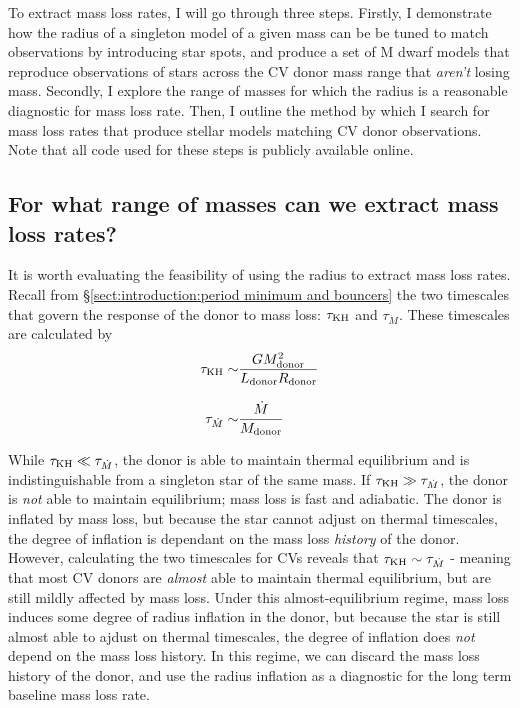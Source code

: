 To extract mass loss rates, I will go through three steps.
Firstly, I demonstrate how the radius of a singleton model of a given mass can be be tuned to match observations by introducing star spots, and produce a set of M dwarf models that reproduce observations of stars across the CV donor mass range that \textit{aren't} losing mass.
Secondly, I explore the range of masses for which the radius is a reasonable diagnostic for mass loss rate.
Then, I outline the method by which I search for mass loss rates that produce stellar models matching CV donor observations.
Note that all code used for these steps is publicly available online.


\subsection{For what range of masses can we extract mass loss rates?}
\label{sect:modelling:MESA massloss allowable mass range}

It is worth evaluating the feasibility of using the radius to extract mass loss rates. Recall from \S\ref{sect:introduction:period minimum and bouncers} the two timescales that govern the response of the donor to mass loss: $\tau_{\rm KH}$ and $\tau_{\dot M}$. These timescales are calculated by
\begin{align}
    \tau_{\rm KH} \sim& \frac{G M_{\rm donor}^2}{L_{\rm donor} R_{\rm donor}} \\[8pt]
    \tau_{\dot M} \sim& \frac{\dot M}{M_{\rm donor}}
\end{align}

While $\tau_{\rm KH} \ll \tau_{\dot M}$, the donor is able to maintain thermal equilibrium and is indistinguishable from a singleton star of the same mass.
If $\tau_{\rm KH} \gg \tau_{\dot M}$, the donor is \textit{not} able to maintain equilibrium; mass loss is fast and adiabatic. The donor is inflated by mass loss, but because the star cannot adjust on thermal timescales, the degree of inflation is dependant on the mass loss \textit{history} of the donor.
However, calculating the two timescales for CVs reveals that $\tau_{\rm KH} \sim \tau_{\dot M}$ \citep{knigge11} - meaning that most CV donors are \textit{almost} able to maintain thermal equilibrium, but are still mildly affected by mass loss.
Under this almost-equilibrium regime, mass loss induces some degree of radius inflation in the donor, but because the star is still almost able to ajdust on thermal timescales, the degree of inflation does \textit{not} depend on the mass loss history. In this regime, we can discard the mass loss history of the donor, and use the radius inflation as a diagnostic for the long term baseline mass loss rate.

